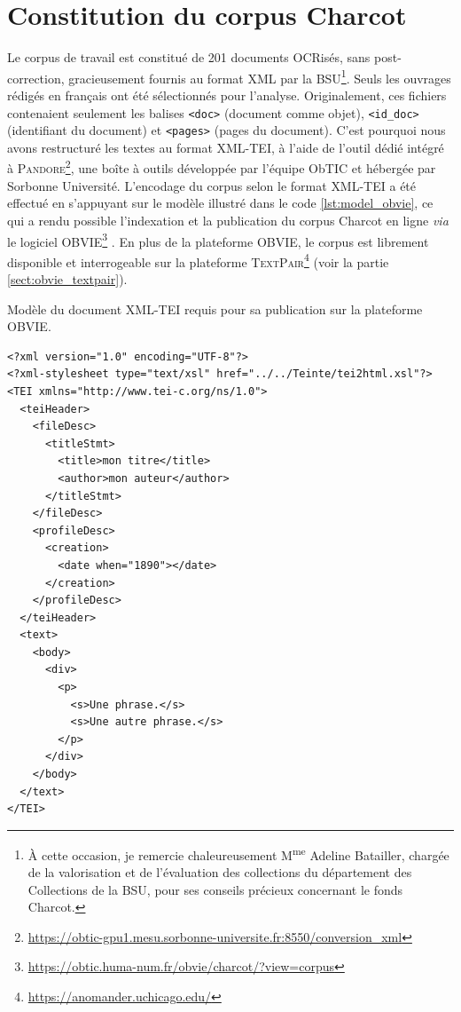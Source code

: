 \section{Constitution du corpus Charcot}
Le corpus de travail est constitué de 201 documents OCRisés, sans post-correction, gracieusement fournis au format \textsc{XML} par la \textsc{BSU}\footnote{À cette occasion, je remercie chaleureusement M\textsuperscript{me} Adeline Batailler, chargée de la valorisation et de l'évaluation des collections du département des Collections de la \textsc{BSU}, pour ses conseils précieux concernant le fonds Charcot.}. Seuls les ouvrages rédigés en français ont été sélectionnés pour l'analyse. Originalement, ces fichiers contenaient seulement les balises \texttt{<doc>} (document comme objet), \texttt{<id\_doc>} (identifiant du document) et \texttt{<pages>} (pages du document). C'est pourquoi nous avons restructuré les textes au format \textsc{XML-TEI}, à l'aide de l’outil dédié intégré à \textsc{Pandore}\footnote{\url{https://obtic-gpu1.mesu.sorbonne-universite.fr:8550/conversion_xml}}, une boîte à outils développée par l'équipe ObTIC et hébergée par Sorbonne Université. L'encodage du corpus selon le format \textsc{XML-TEI} a été effectué en s'appuyant sur le modèle illustré dans le code \ref{lst:model_obvie}, ce qui a rendu possible l'indexation et la publication du corpus Charcot en ligne \textit{via} le logiciel \textsc{OBVIE}\footnote{\url{https://obtic.huma-num.fr/obvie/charcot/?view=corpus}} \citep{alrahabi2022obvie}. En plus de la plateforme \textsc{OBVIE}, le corpus est librement disponible et interrogeable sur la plateforme \textsc{TextPair}\footnote{\url{https://anomander.uchicago.edu/}} (voir la partie \ref{sect:obvie_textpair}).
\begin{listing}[h]
	\caption{Modèle du document \textsc{XML-TEI} requis pour sa publication sur la plateforme \textsc{OBVIE}.}
	\label{lst:model_obvie}
\begin{verbatim}
<?xml version="1.0" encoding="UTF-8"?>
<?xml-stylesheet type="text/xsl" href="../../Teinte/tei2html.xsl"?>
<TEI xmlns="http://www.tei-c.org/ns/1.0">
  <teiHeader>
    <fileDesc>
      <titleStmt>
        <title>mon titre</title>
        <author>mon auteur</author>
      </titleStmt>
    </fileDesc>
    <profileDesc>
      <creation>
        <date when="1890"></date>
      </creation>
    </profileDesc>
  </teiHeader>
  <text>
    <body>
      <div>
        <p>
          <s>Une phrase.</s>
          <s>Une autre phrase.</s>
        </p>
      </div>
    </body>
  </text>
</TEI>
\end{verbatim}
\end{listing}


